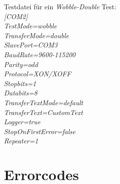 Testdatei für ein \textit{Wobble-Double} Test:\\

\textit{
\hspace*{10mm}[COM2]\\
\hspace*{10mm}TestMode=wobble\\
\hspace*{10mm}TransferMode=double\\
\hspace*{10mm}SlavePort=COM3\\
\hspace*{10mm}BaudRate=9600-115200\\
\hspace*{10mm}Parity=odd\\
\hspace*{10mm}Protocol=XON/XOFF\\
\hspace*{10mm}Stopbits=1\\
\hspace*{10mm}Databits=8\\
\hspace*{10mm}TransferTextMode=default\\
\hspace*{10mm}TransferText=CustomText\\
\hspace*{10mm}Logger=true\\
\hspace*{10mm}StopOnFirstError=false\\
\hspace*{10mm}Repeater=1\\
}


\newpage
\section{Errorcodes}\label{Errorcodes}
